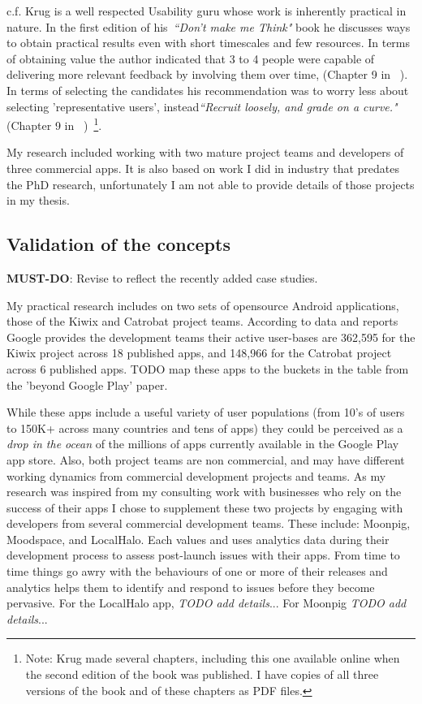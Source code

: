 c.f. Krug is a well respected Usability guru whose work is inherently practical in nature. In the first edition of his~\emph{``Don't make me Think"} book he discusses ways to obtain practical results even with short timescales and few resources. In terms of obtaining value the author indicated that 3 to 4 people were capable of delivering more relevant feedback by involving them over time, (Chapter 9 in ~\cite{krug2000dont_make_me_think}). In terms of selecting the candidates his recommendation was to worry less about selecting 'representative users', instead\emph{``Recruit loosely, and grade on a curve."} (Chapter 9 in ~\cite{krug2000dont_make_me_think})~\footnote{Note: Krug made several chapters, including this one available online when the second edition of the book was published. I have copies of all three versions of the book and of these chapters as PDF files.}.


My research included working with two mature project teams and developers of three commercial apps. It is also based on work I did in industry that predates the PhD research, unfortunately I am not able to provide details of those projects in my thesis. 


\subsection{Validation of the concepts}
\textbf{MUST-DO}: Revise to reflect the recently added case studies. 

My practical research includes on two sets of opensource Android applications, those of the Kiwix and Catrobat project teams. According to data and reports Google provides the development teams their active user-bases are 362,595 for the Kiwix project across 18 published apps, and 148,966 for the Catrobat project across 6 published apps. %
TODO map these apps to the buckets in the table from the 'beyond Google Play' paper.

While these apps include a useful variety of user populations (from 10's of users to 150K+ across many countries and tens of apps) they could be perceived as a \emph{drop in the ocean} of the millions of apps currently available in the Google Play app store. Also, both project teams are non commercial, and may have different working dynamics from commercial development projects and teams. As my research was inspired from my consulting work with businesses who rely on the success of their apps I chose to supplement these two projects by engaging with developers from several commercial development teams. These include: Moonpig, Moodspace, and LocalHalo. Each values and uses analytics data during their development process to assess post-launch issues with their apps. From time to time things go awry with the behaviours of one or more of their releases and analytics helps them to identify and respond to issues before they become pervasive. For the LocalHalo app, \emph{TODO add details}... For Moonpig \emph{TODO add details}...

